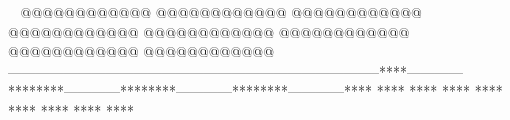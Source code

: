     @@@@@@@@@@@@        @@@@@@@@@@@@        @@@@@@@@@@@@        @@@@@@@@@@@@        @@@@@@@@@@@@        @@@@@@@@@@@@        @@@@@@@@@@@@        @@@@@@@@@@@@    --------------------------------------------------------------------------------****------------********------------********------------********------------****    ****    ****        ****    ****        ****    ****        ****    ****